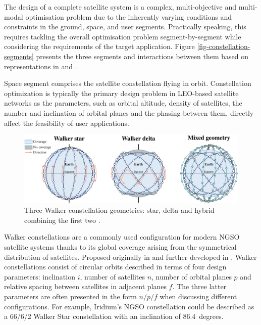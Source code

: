 \documentclass[english, 12pt, a4paper, elec, utf8, a-1b, online]{aaltothesis}
\begin{document}
The design of a complete satellite system is a complex, multi-objective and multi-modal optimisation problem due to the inherently varying conditions and constraints in the ground, space, and user segments.
Practically speaking, this requires tackling the overall optimisation problem segment-by-segment while considering the requirements of the target application.
Figure \ref{fig-constellation-segments} presents the three segments and interactions between them based on representations in \cite{euspa-secure-satcom-2023} and \cite{celikbilek2022survey}.

Space segment comprises the satellite constellation flying in orbit.
Constellation optimization is typically the primary design problem in LEO-based satellite networks as the parameters, such as orbital altitude, density of satellites, the number and inclination of orbital planes and the phasing between them, directly affect the feasibility of user applications.

\begin{figure}[h]
  \centering
  \includegraphics[width=145mm]{figures/walker-constellations-compressed.png}
  \caption{Three Walker constellation geometries: star, delta and hybrid combining the first two \cite{leyvamayorga2022nongeostationary}.}
  \label{fig-walker-constellations}
\end{figure}

Walker constellations are a commonly used configuration for modern NGSO satellite systems thanks to its global coverage arising from the symmetrical distribution of satellites.
Proposed originally in \cite{walker1970circular} and further developed in \cite{walker1984satellite}, Walker constellations consist of circular orbits described in terms of four design parameters: inclination $i$, number of satellites $n$, number of orbital planes $p$ and relative spacing between satellites in adjacent planes $f$. The three latter parameters are often presented in the form $n/p/f$ when discussing different configurations.
For example, Iridium's NGSO constellation could be described as a 66/6/2 Walker Star constellation with an inclination of 86.4~degrees.
\end{document}
